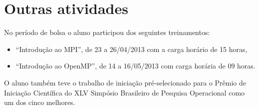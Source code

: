 \section{Outras atividades}
No período de bolsa o aluno participou dos seguintes treinamentos:
\begin{itemize}
  \item ``Introdução ao MPI'', de 23 a 26/04/2013 com a carga horário de 15
    horas,
  \item ``Introdução ao OpenMP'', de 14 a 16/05/2013 com carga horária de 09
    horas.
\end{itemize}

O aluno também teve o trabalho de iniciação pré-selecionado para o Prêmio de
Iniciação Científica do XLV Simpósio Brasileiro de Pesquisa Operacional como um
dos cinco melhores.
